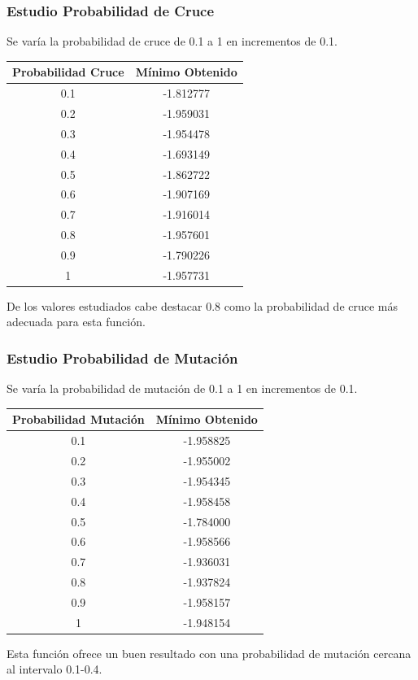 \documentclass[12pt]{article}
\begin{document}
\subsubsection*{Estudio Probabilidad de Cruce}
	Se varía la probabilidad de cruce de 0.1 a 1 en incrementos de 0.1.
\begin{table}[H]
\begin{center}
\begin{tabular}{|cc|} \hline
Probabilidad Cruce & Mínimo Obtenido \\  \hline
0.1 & -1.812777 \\ 
0.2 & -1.959031 \\ 
0.3 & -1.954478 \\
0.4 & -1.693149 \\
0.5 & -1.862722 \\
0.6 & -1.907169 \\
0.7 & -1.916014 \\
0.8 & -1.957601 \\ 
0.9 & -1.790226 \\
1   & -1.957731 \\  \hline
\end{tabular}
\end{center}
\end{table}
	De los valores estudiados cabe destacar 0.8 como la probabilidad de cruce más adecuada para esta función.

\subsubsection*{Estudio Probabilidad de Mutación}
	Se varía la probabilidad de mutación de 0.1 a 1 en incrementos de 0.1.
\begin{table}[H]
\begin{center}
\begin{tabular}{|cc|} \hline
Probabilidad Mutación & Mínimo Obtenido \\  \hline
0.1 & -1.958825 \\ 
0.2 & -1.955002 \\ 
0.3 & -1.954345 \\
0.4 & -1.958458 \\
0.5 & -1.784000 \\
0.6 & -1.958566 \\
0.7 & -1.936031 \\
0.8 & -1.937824 \\ 
0.9 & -1.958157 \\
1   & -1.948154 \\  \hline
\end{tabular}
\end{center}
\end{table}
	Esta función ofrece un buen resultado con una probabilidad de mutación cercana al intervalo 0.1-0.4.
\end{document}
